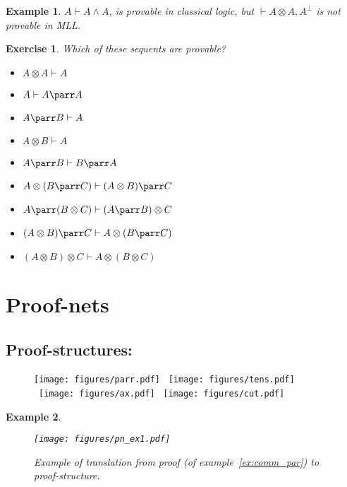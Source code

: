 \documentclass[a4paper,10pt]{article}
\newtheorem{ex}{Example}
\newtheorem{exo}{Exercise}
\begin{document}
\begin{ex}
	$A \vdash A \land A$, is provable in classical logic, but $\vdash A\otimes A, A ^\perp$ is not provable in MLL.
\end{ex}


\begin{exo}
	Which of these sequents are provable?
	
	\begin{multicols}{2}
	\begin{itemize}
		\item $A \otimes A\vdash A$
		\item $A\vdash A\parr A$
		\item $A \parr B\vdash A$
		\item $A\otimes B\vdash A$
		\item $A \parr B\vdash B \parr A$
		\item $A \otimes (B\parr C)\vdash (A\otimes B)\parr C$
		\item $A \parr (B\otimes C)\vdash (A\parr B)\otimes C$
		\item $(A\otimes B)\parr C \vdash A \otimes (B \parr C)$
		\item $(A\otimes B)\otimes C \vdash A \otimes (B \otimes C)$
	\end{itemize}	
	\end{multicols}
\end{exo}

\section{Proof-nets}

\subsection{Proof-structures:}

\begin{figure}[h]
\begin{center}
	\texttt{[image: figures/parr.pdf]} \ 
	\texttt{[image: figures/tens.pdf]} \ 
	\texttt{[image: figures/ax.pdf]} \ 
	\texttt{[image: figures/cut.pdf]} \ 
\end{center}
\end{figure}

\begin{ex}
	\begin{figure}[h]
	\begin{center}
		\texttt{[image: figures/pn\_ex1.pdf]}
		\caption{Example of translation from proof (of example~\ref{ex:comm_par}) to proof-structure.}
	\end{center}
	\end{figure}
\end{ex}
\end{document}
